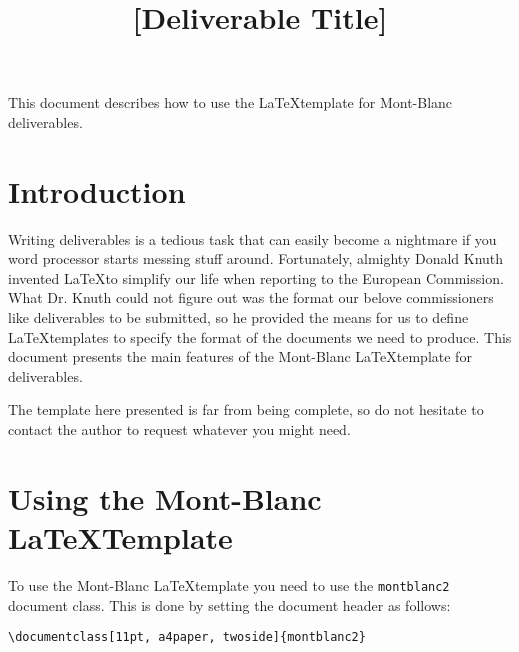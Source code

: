 \documentclass[11pt, a4paper, twoside]{montblanc2}
\begin{document}
\devnum{[x.x]}
\title{[Deliverable Title]}
\version{[x.x]}
\deadline{[x]}

\maketitle

\begin{changelog}
\end{changelog}

\frontmatter

\begin{executive}
This document describes how to use the \LaTeX template for Mont-Blanc deliverables.
\end{executive}

\section{Introduction}
Writing deliverables is a tedious task that can easily become a nightmare if you word processor 
starts messing stuff around. Fortunately, almighty Donald Knuth invented \LaTeX to simplify our life 
when reporting to the European Commission. What Dr. Knuth could not figure out was the format our 
belove commissioners like deliverables to be submitted, so he provided the means for us to define 
\LaTeX templates to specify the format of the documents we need to produce. This document presents 
the main features of the Mont-Blanc \LaTeX template for deliverables.

The template here presented is far from being complete, so do not hesitate to contact the author to 
request whatever you might need.

\section{Using the Mont-Blanc \LaTeX Template}
To use the Mont-Blanc \LaTeX template you need to use the \texttt{montblanc2} document class. This 
is done by setting the document header as follows:
\begin{verbatim}
\documentclass[11pt, a4paper, twoside]{montblanc2}
\end{verbatim}
\end{document}
